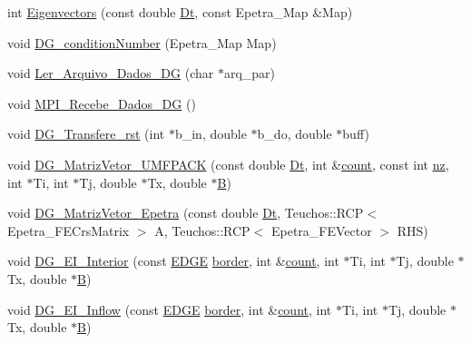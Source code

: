 \begin{DoxyCompactItemize}
\item 
int \hyperlink{classDG__Prob_a23d58d1583859acafd9a6d5888424374}{Eigenvectors} (const double \hyperlink{classDG__Prob_ad4de8afc3624f6559222e8f1f10fce6f}{Dt}, const Epetra\+\_\+\+Map \&Map)
\item 
void \hyperlink{classDG__Prob_acb4b2ec3201e22d62bcf50b947b10dc5}{D\+G\+\_\+condition\+Number} (Epetra\+\_\+\+Map Map)
\item 
void \hyperlink{classDG__Prob_ab28a5690b7fc91e44fe435107a4076ae}{Ler\+\_\+\+Arquivo\+\_\+\+Dados\+\_\+\+DG} (char $\ast$arq\+\_\+par)
\item 
void \hyperlink{classDG__Prob_a6941d468eec44d02bfd3f2eaedf661dc}{M\+P\+I\+\_\+\+Recebe\+\_\+\+Dados\+\_\+\+DG} ()
\item 
void \hyperlink{classDG__Prob_a6ccc7a5921dd48f971da35e5632a0b7e}{D\+G\+\_\+\+Transfere\+\_\+rst} (int $\ast$b\+\_\+in, double $\ast$b\+\_\+do, double $\ast$buff)
\item 
void \hyperlink{classDG__Prob_a2e99df149cf01faccb484389f8627d33}{D\+G\+\_\+\+Matriz\+Vetor\+\_\+\+U\+M\+F\+P\+A\+CK} (const double \hyperlink{classDG__Prob_ad4de8afc3624f6559222e8f1f10fce6f}{Dt}, int \&\hyperlink{classDG__Prob_a638611f0f0a04508f43ac7554bc8c7e2}{count}, const int \hyperlink{classDG__Prob_a18aa37594c06d6a879fad8d06f1950d1}{nz}, int $\ast$Ti, int $\ast$Tj, double $\ast$Tx, double $\ast$\hyperlink{ASPFunctions_8cpp_a57d673f8d6833fb7a7aced326df10ca9}{B})
\item 
void \hyperlink{classDG__Prob_a68ffd2ab09f51c7b29b88b006fbc5c49}{D\+G\+\_\+\+Matriz\+Vetor\+\_\+\+Epetra} (const double \hyperlink{classDG__Prob_ad4de8afc3624f6559222e8f1f10fce6f}{Dt}, Teuchos\+::\+R\+CP$<$ Epetra\+\_\+\+F\+E\+Crs\+Matrix $>$ A, Teuchos\+::\+R\+CP$<$ Epetra\+\_\+\+F\+E\+Vector $>$ R\+HS)
\item 
void \hyperlink{classDG__Prob_a862dcc9991b9091de30323b1d2b1c5a5}{D\+G\+\_\+\+E\+I\+\_\+\+Interior} (const \hyperlink{structEDGE}{E\+D\+GE} \hyperlink{classGeProb_a6c144ac05b601c5d6141c711edaaa775}{border}, int \&\hyperlink{classDG__Prob_a638611f0f0a04508f43ac7554bc8c7e2}{count}, int $\ast$Ti, int $\ast$Tj, double $\ast$Tx, double $\ast$\hyperlink{ASPFunctions_8cpp_a57d673f8d6833fb7a7aced326df10ca9}{B})
\item 
void \hyperlink{classDG__Prob_a6e6d838559f53cff2a917c3e9a5111ba}{D\+G\+\_\+\+E\+I\+\_\+\+Inflow} (const \hyperlink{structEDGE}{E\+D\+GE} \hyperlink{classGeProb_a6c144ac05b601c5d6141c711edaaa775}{border}, int \&\hyperlink{classDG__Prob_a638611f0f0a04508f43ac7554bc8c7e2}{count}, int $\ast$Ti, int $\ast$Tj, double $\ast$Tx, double $\ast$\hyperlink{ASPFunctions_8cpp_a57d673f8d6833fb7a7aced326df10ca9}{B})

\end{DoxyCompactItemize}
